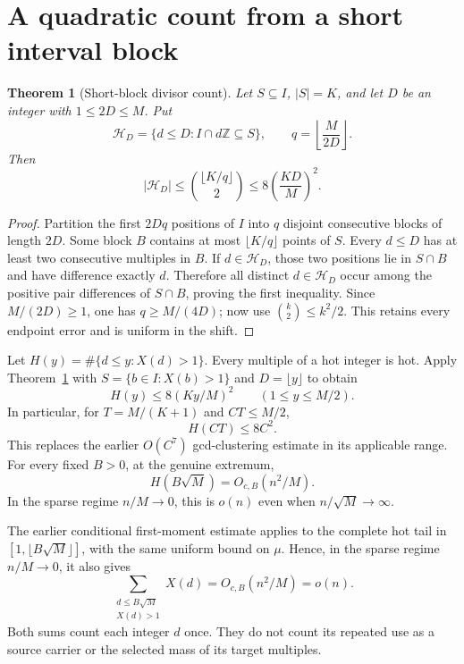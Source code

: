 \documentclass[a4paper,11pt]{article}
\newtheorem{theorem}{Theorem}
\begin{document}
\section{A quadratic count from a short interval block}
\begin{theorem}[Short-block divisor count]\label{thm:short}
Let $S\subseteq I$, $|S|=K$, and let $D$ be an integer with $1\le2D\le M$. Put
\[
 \mathcal H_D=\{d\le D:I\cap d\mathbb Z\subseteq S\},
 \qquad q=\left\lfloor\frac{M}{2D}\right\rfloor.
\]
Then
\begin{equation}\label{eq:count}
 \boxed{\displaystyle
 |\mathcal H_D|\le
 \binom{\lfloor K/q\rfloor}{2}
 \le8\left(\frac{KD}{M}\right)^2.}
\end{equation}
\end{theorem}
\begin{proof}
Partition the first $2Dq$ positions of $I$ into $q$ disjoint consecutive blocks of length $2D$. Some block $B$ contains at most $\lfloor K/q\rfloor$ points of $S$. Every $d\le D$ has at least two consecutive multiples in $B$. If $d\in\mathcal H_D$, those two positions lie in $S\cap B$ and have difference exactly $d$. Therefore all distinct $d\in\mathcal H_D$ occur among the positive pair differences of $S\cap B$, proving the first inequality. Since $M/(2D)\ge1$, one has $q\ge M/(4D)$; now use $\binom{k}{2}\le k^2/2$. This retains every endpoint error and is uniform in the shift.
\end{proof}

Let $H(y)=\#\{d\le y:X(d)>1\}$. Every multiple of a hot integer is hot. Apply Theorem~\ref{thm:short} with $S=\{b\in I:X(b)>1\}$ and $D=\lfloor y\rfloor$ to obtain
\begin{equation}\label{eq:hot}
 \boxed{H(y)\le8(Ky/M)^2\qquad(1\le y\le M/2).}
\end{equation}
In particular, for $T=M/(K+1)$ and $CT\le M/2$,
\[
 H(CT)\le8C^2.
\]
This replaces the earlier $O(C^7)$ gcd-clustering estimate in its applicable range. For every fixed $B>0$, at the genuine extremum,
\begin{equation}\label{eq:sqrt}
 \boxed{H(B\sqrt M)=O_{c,B}(n^2/M).}
\end{equation}
In the sparse regime $n/M\to0$, this is $o(n)$ even when $n/\sqrt M\to\infty$.

The earlier conditional first-moment estimate applies to the complete hot tail in $[1,\lfloor B\sqrt M\rfloor]$, with the same uniform bound on $\mu$. Hence, in the sparse regime $n/M\to0$, it also gives
\begin{equation}\label{eq:weighted}
 \boxed{\sum_{\substack{d\le B\sqrt M\\X(d)>1}}X(d)
       =O_{c,B}(n^2/M)=o(n).}
\end{equation}
Both sums count each integer $d$ once. They do not count its repeated use as a source carrier or the selected mass of its target multiples.
\end{document}
